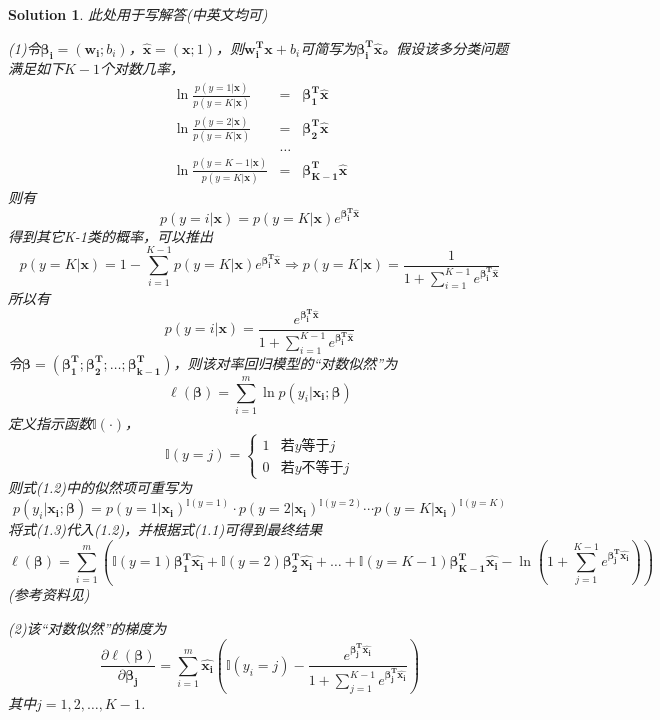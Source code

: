\documentclass[a4paper,UTF8]{article}
\numberwithin{equation}{section}
\newtheorem*{solution}{Solution}
\begin{document}
\begin{solution}
	此处用于写解答(中英文均可)
~\\\item(1)令$\bm{\beta_i} = (\bm{w_i};b_i)$，$\hat{\mathbf{x}}=(\mathbf{x};1)$，则$\bm{w_i^T}\mathbf{x}+b_i$可简写为$\bm{\beta_i^T}\hat{\mathbf{x}}$。假设该多分类问题满足如下$K-1$个对数几率，
\begin{eqnarray*}
	\ln\frac{p(y=1|\mathbf{x})}{p(y=K|\mathbf{x})}&=&\bm{\beta_1^T}\hat{\mathbf{x}}\\
	\ln\frac{p(y=2|\mathbf{x})}{p(y=K|\mathbf{x})}&=&\bm{\beta_2^T}\hat{\mathbf{x}}\\
	&\dots&\\
	\ln\frac{p(y={K-1}|\mathbf{x})}{p(y=K|\mathbf{x})}&=&\bm{\beta_{K-1}^T}\hat{\mathbf{x}}
\end{eqnarray*}
则有
\[
    p(y=i|\mathbf{x}) = p(y=K|\mathbf{x})e^{\bm{\beta_i^T}\hat{\mathbf{x}}}
\]
得到其它K-1类的概率，可以推出
\[
    p(y=K|\bm{x}) = 1 - \sum_{i=1}^{K-1}p(y=K|\bm{x})e^{\bm{\beta_i^T}\hat{\bm{x}}} \Longrightarrow p(y=K|\bm{x}) = \frac{1}{1+\sum_{i=1}^{K-1}e^{\bm{\beta_i^T}\hat{\mathbf{x}}}}
\]
所以有
\begin{equation}
    p(y=i|\bm{x}) = \frac{e^{\bm{\beta_i^T}\hat{\mathbf{x}}}}{1+\sum_{i=1}^{K-1}e^{\bm{\beta_i^T}\hat{\mathbf{x}}}}
\end{equation}
令$\bm{\beta} = (\bm{\beta_1^T};\bm{\beta_2^T};\dots;\bm{\beta_{k-1}^T})$，则该对率回归模型的“对数似然”为
\begin{equation}
    \ell(\bm{\beta}) = \sum_{i=1}^{m}\ln p(y_i | \bm{x_i};\bm{\beta})
\end{equation}
定义指示函数$\mathbb{I}(\cdot)$，
$$\mathbb{I}(y=j)=
\begin{cases}
1& \text{若$y$等于$j$}\\
0& \text{若$y$不等于$j$}
\end{cases}$$
则式(1.2)中的似然项可重写为
\begin{equation}
    p(y_i | \bm{x_i};\bm{\beta}) = p(y=1|\bm{x_i})^{\mathbb{I}(y=1)}\cdot p(y=2|\bm{x_i})^{\mathbb{I}(y=2)}\cdots p(y=K|\bm{x_i})^{\mathbb{I}(y=K)}
\end{equation}
将式(1.3)代入(1.2)，并根据式(1.1)可得到最终结果
\begin{equation}
    \ell(\bm{\beta}) = \sum_{i=1}^{m}\left(\mathbb{I}(y=1)\bm{\beta_1^T}\hat{\bm{x_i}} + \mathbb{I}(y=2)\bm{\beta_2^T}\hat{\bm{x_i}} + \dots +\mathbb{I}(y=K-1)\bm{\beta_{K-1}^T}\hat{\bm{x_i}}-\ln (1+\sum_{j=1}^{K-1}e^{\bm{\beta_j^T}\hat{\bm{x_i}}})\right)
\end{equation}
(参考资料见\cite{ref1})
\\ \item(2)该“对数似然”的梯度为
\[
    \frac{\partial{\ell(\bm{\beta})}}{\partial{\bm{\beta_j}}} = \sum_{i=1}^{m}\hat{\bm{x_i}}\left(\mathbb{I}(y_i=j)-\frac{e^{\bm{\beta_j^T}\hat{\bm{x_i}}}}{1+\sum_{j=1}^{K-1}e^{\bm{\beta_j^T}\hat{\bm{x_i}}}}\right)
\]
其中$j=1, 2, \dots, K-1$.
\end{solution}
\newpage
\end{document}
